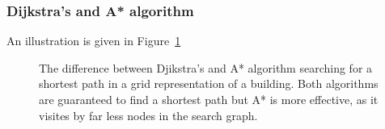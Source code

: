 \subsubsection{Dijkstra's and A* algorithm}
An illustration is given in Figure~\ref{fig:fig_overview}
\begin{figure}[thpb]
	  \myfloatalign
      \footnotesize
      \centering
    
   \caption[The difference between Djikstra's and A* algorithm searching for a shortest path in a grid representation of a building.]{The difference between Djikstra's and A* algorithm searching for a shortest path in a grid representation of a building. Both algorithms are guaranteed to find a shortest path but A* is more effective, as it visites by far less nodes in the search graph. }
   \label{fig:fig_overview}
\end{figure}
